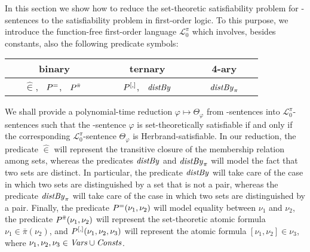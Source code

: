 \documentclass[a4paper]{llncs}
\newcommand{\Elpizero}{\ensuremath{\mathcal{L}_{0}^{\pi}}\xspace}
\newcommand{\nonpairssym}{\bar{\pi}}
\newcommand{\nonpairs}[1]{\nonpairssym(#1)}
\begin{document}
\newcommand{\memhatP}{\widehat{\in}}
\newcommand{\memhat}[2]{#1 \memhatP #2}
\newcommand{\dist}[2]{\distS(#1,#2)}
\newcommand{\distP}[2]{\distPS(#1,#2)}
\newcommand{\distby}[3]{\distbyS(#1,#2,#3)}
\newcommand{\distPby}[4]{\distPbyS(#1,#2,#3,#4)}



In this section we show how to reduce the set-theoretic 
satisfiability problem for  \Forallpizero-sentences to the 
satisfiability problem in first-order logic. To this purpose, we 
introduce the function-free first-order language \Elpizero which 
involves, besides constants, also the following
predicate symbols:
\begin{center}
\begin{tabular}[m]{|c|c|c|}
     \hline
     binary & ternary & 4-ary \\
     \hline
~~~$\memhatP$, ~$P^{=}$, ~$P^{\bar{\pi}}$
~~~  &
%
~~~$P^{[,]}$,  ~$\mathit{distBy}$~~~ &
%
~~~$\mathit{distBy}_{\pi}$~~~\\
\hline
\end{tabular}
\end{center}


We shall provide a polynomial-time reduction $\varphi \mapsto
\Theta_{\varphi}$ from \Forallpizero-sentences into \Elpizero-sentences
such that the \Forallpizero-sentence $\varphi$ is set-theoretically
satisfiable if and only if the corresponding \Elpizero-sentence 
$\Theta_{\varphi}$ is Herbrand-satisfiable.
%
In our reduction, the predicate $\memhatP$ will represent the
transitive closure of the membership relation among sets, whereas the
predicates
$\mathit{distBy}$ and $\mathit{distBy}_{\pi}$ will model the fact that two sets are 
distinct.  In particular, the
predicate
$\mathit{distBy}$ will take care of the case in which
two sets are distinguished by a set that is not a pair,
whereas the predicate
$\mathit{distBy}_{\pi}$ will take care of the
case in which two sets are distinguished by a pair.  Finally, the predicate
$P^{=}(\nu_1,\nu_2)$ will model equality between
$\nu_1$ and $\nu_2$, the predicate $P^{\bar{\pi}}(\nu_1, \nu_2)$
will represent the set-theoretic atomic formula $\nu_1 \in \nonpairs{\nu_2}$,
and $P^{[,]}(\nu_1, \nu_2, \nu_3)$ will represent the atomic 
formula $[\nu_1, \nu_2] \in \nu_3$, where $\nu_1,\nu_2,\nu_3 \in 
\mathit{Vars} \cup \mathit{Consts}$.
\end{document}
